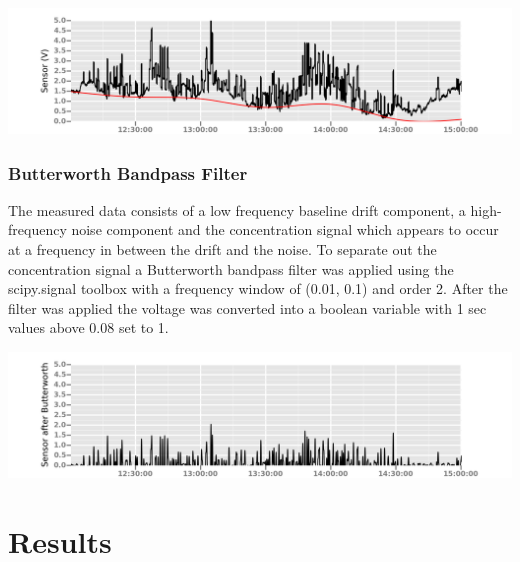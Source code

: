\documentclass[a0, landscape]{a0poster}
\begin{document}
\begin{multicols}{3}
\begin{center}			
	\includegraphics[width=\linewidth]{Spline_fit}
\end{center}

\subsubsection*{Butterworth Bandpass Filter} 
The measured data consists of a low frequency baseline drift component, a high-frequency noise component and the concentration signal which appears to occur at a frequency in between the drift and the noise. To separate out the concentration signal a Butterworth bandpass filter was applied using the scipy.signal toolbox with a frequency window of (0.01, 0.1) and order 2. After the filter was applied the voltage was converted into a boolean variable with 1 sec values above 0.08 set to 1. 

\begin{center}			
	\includegraphics[width=\linewidth]{Butterworth_filt}
\end{center}
\section*{Results}

\end{multicols}
\end{document}
